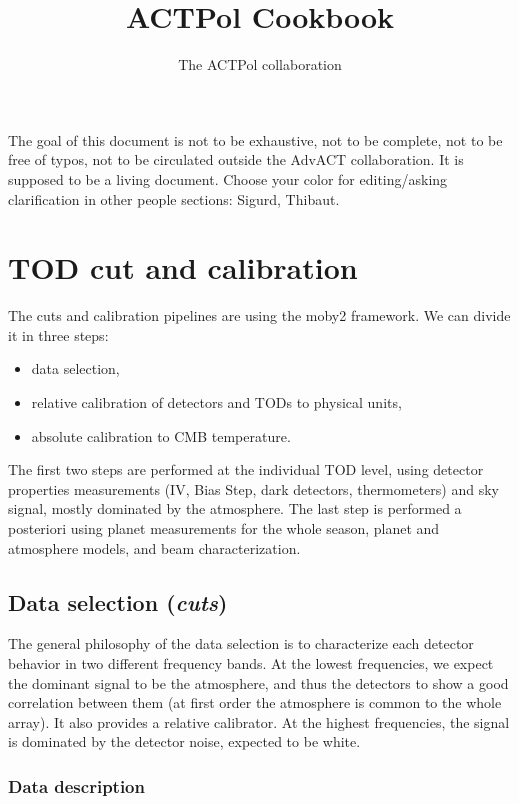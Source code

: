 \documentclass[a4paper, 11pt]{article}
\newcommand{\skn}[1]{{\color{red}#1}}
\newcommand{\TIB}[1]{{\color{blue}#1}}
\begin{document}
\title{\textbf{ACTPol Cookbook}}
\author{The ACTPol collaboration}
\maketitle

The goal of this document is not to be exhaustive, not to be complete, not
to be free of typos, not to be circulated outside the AdvACT collaboration.
It is supposed to be a living document.  Choose your color for
editing/asking clarification in other people sections: \skn{Sigurd}, \TIB{Thibaut}.

\section{TOD cut and calibration}

The cuts and calibration pipelines are using the moby2 framework. We can divide it in three steps:
\begin{itemize}
\item data selection,
\item relative calibration of detectors and TODs to physical units,
\item absolute calibration to CMB temperature.
\end{itemize}
The first two steps are performed at the individual TOD level, using detector properties measurements (IV, Bias Step, dark detectors, thermometers) and sky signal, mostly dominated by the atmosphere. The last step is performed a posteriori using planet measurements for the whole season, planet and atmosphere models, and beam characterization.



\subsection{Data selection (\emph{cuts})}
The general philosophy of the data selection is to characterize each detector behavior in two different frequency bands. At the lowest frequencies, we expect the dominant signal to be the atmosphere, and thus the detectors to show a good correlation between them (at first order the atmosphere is common to the whole array). It also provides a relative calibrator. At the highest frequencies, the signal is dominated by the detector noise, expected to be white.

\subsubsection{Data description}
\end{document}
